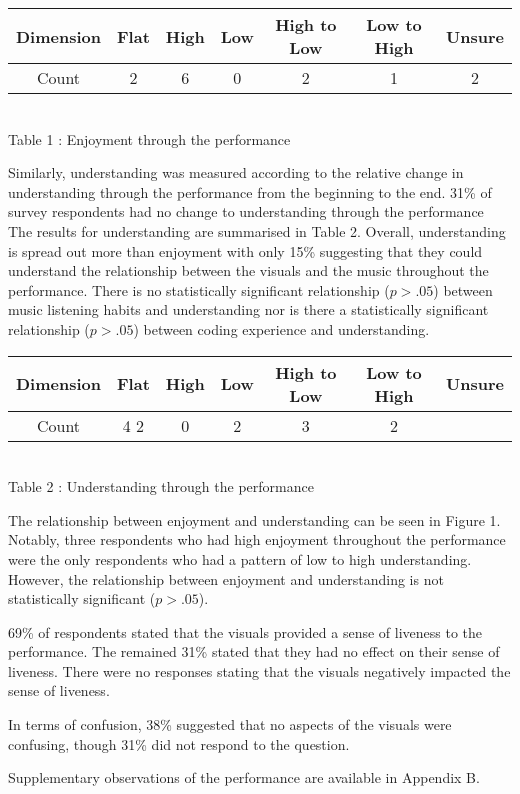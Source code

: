 \begin{tabular}{|c|c|c|c|c|c|c|}
\hline 
Dimension & Flat & High & Low & High to Low & Low to High & Unsure\\
\hline 
Count & 2 &6 &0 &2 &1 &2\\
\hline
\end{tabular}\\
Table 1 : Enjoyment through the performance

Similarly, understanding was measured according to the relative change in understanding through the performance from the beginning to the end. 31\% of survey respondents had no change to understanding through the performance   The results for understanding are summarised in Table 2. Overall, understanding is spread out more than enjoyment with only 15\% suggesting that they could understand the relationship between the visuals and the music throughout the performance. There is no statistically significant relationship ($p > .05$) between music listening habits and understanding nor is there a statistically significant relationship ($p > .05$) between coding experience and understanding.\\

\begin{tabular}{|c|c|c|c|c|c|c|}
\hline 
Dimension & Flat & High & Low & High to Low & Low to High & Unsure\\
\hline 
Count & 4
2&
0&
2&
3&
2 \\
\hline
\end{tabular}\\
Table 2 : Understanding through the performance

The relationship between enjoyment and understanding can be seen in Figure 1. Notably, three respondents who had high enjoyment throughout the performance were the only respondents who had a pattern of low to high understanding. However, the relationship between enjoyment and understanding is not statistically significant ($p > .05$).

69\% of respondents stated that the visuals provided a sense of liveness to the performance. The remained 31\% stated that they had no effect on their sense of liveness. There were no responses stating that the visuals negatively impacted the sense of liveness. 

In terms of confusion, 38\% suggested that no aspects of the visuals were confusing, though 31\% did not respond to the question.

Supplementary observations of the performance are available in Appendix B.

